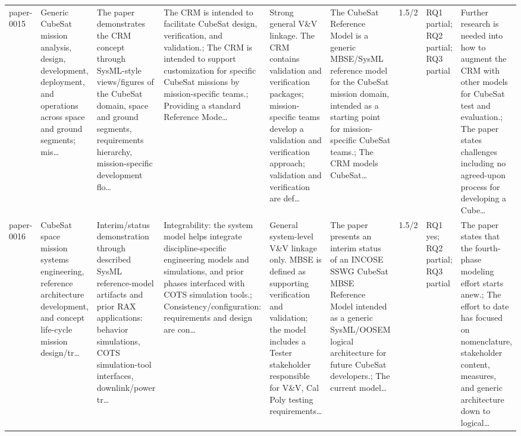 \documentclass[10pt]{article}
\begin{document}
\begin{landscape}
\begin{longtable}{p{1.0cm}p{2.4cm}p{3.1cm}p{3.7cm}p{3.4cm}p{3.1cm}p{1.0cm}p{1.8cm}p{3.4cm}}
paper-0015 & Generic CubeSat mission analysis, design, development, deployment, and operations across space and ground segments; mis… & The paper demonstrates the CRM concept through SysML-style views/figures of the CubeSat domain, space and ground segments, requirements hierarchy, mission-specific development flo… & The CRM is intended to facilitate CubeSat design, verification, and validation.; The CRM is intended to support customization for specific CubeSat missions by mission-specific teams.; Providing a standard Reference Mode… & Strong general V\&V linkage. The CRM contains validation and verification packages; mission-specific teams develop a validation and verification approach; validation and verification are def… & The CubeSat Reference Model is a generic MBSE/SysML reference model for the CubeSat mission domain, intended as a starting point for mission-specific CubeSat teams.; The CRM models CubeSat… & 1.5/2 & RQ1 partial; RQ2 partial; RQ3 partial & Further research is needed into how to augment the CRM with other models for CubeSat test and evaluation.; The paper states challenges including no agreed-upon process for developing a Cube… \\
paper-0016 & CubeSat space mission systems engineering, reference architecture development, and concept life-cycle mission design/tr… & Interim/status demonstration through described SysML reference-model artifacts and prior RAX applications: behavior simulations, COTS simulation-tool interfaces, downlink/power tr… & Integrability: the system model helps integrate discipline-specific engineering models and simulations, and prior phases interfaced with COTS simulation tools.; Consistency/configuration: requirements and design are con… & General system-level V\&V linkage only. MBSE is defined as supporting verification and validation; the model includes a Tester stakeholder responsible for V\&V, Cal Poly testing requirements… & The paper presents an interim status of an INCOSE SSWG CubeSat MBSE Reference Model intended as a generic SysML/OOSEM logical architecture for future CubeSat developers.; The current model… & 1.5/2 & RQ1 yes; RQ2 partial; RQ3 partial & The paper states that the fourth-phase modeling effort starts anew.; The effort to date has focused on nomenclature, stakeholder content, measures, and generic architecture down to logical… \\

\end{longtable}
\end{landscape}
\end{document}

